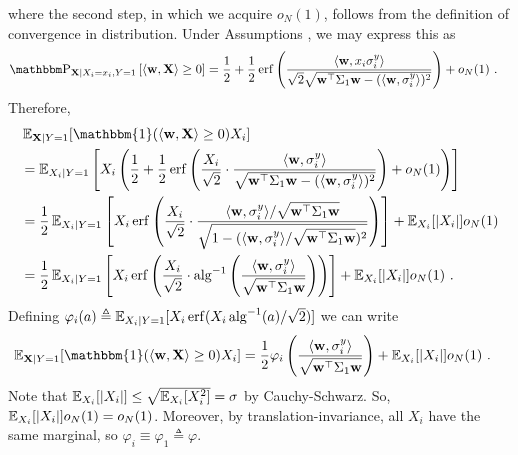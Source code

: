 where the second step, in which we acquire $o_N(1)$, follows from the definition of convergence in distribution.
Under Assumptions , we may express this as
\begin{align*}
    \PR_{\mathbf{X} \mid X_i = x_i, Y = 1} \left[  \langle \mathbf{w}, \mathbf{X} \rangle \geq 0 \right]
    &= \frac{1}{2} + \frac{1}{2} \operatorname{erf}\left( \frac{\langle \mathbf{w}, x_i \sigma_i^y \rangle }{ \sqrt{2} \sqrt{ \mathbf{w}^\top \Sigma_1 \mathbf{w} - (\langle \mathbf{w}, \sigma_i^y \rangle)^2 } } \right) + o_N(1)~.
\end{align*}
Therefore,
\begin{align*}
    &\E_{\mathbf{X} \mid Y=1}[ \mathbbm{1}( \langle \mathbf{w}, \mathbf{X} \rangle \geq 0 ) X_i ] \\
    &= \E_{ X_i \mid Y=1 } \left[ X_i \left( \frac{1}{2} + \frac{1}{2} \operatorname{erf}\left( \frac{X_i}{\sqrt{2}} \cdot \frac{\langle \mathbf{w}, \sigma_i^y \rangle }{ \sqrt{ \mathbf{w}^\top \Sigma_1 \mathbf{w} - (\langle \mathbf{w}, \sigma_i^y \rangle)^2 } } \right) + o_N(1) \right) \right] \\
    &= \frac{1}{2} \E_{ X_i \mid Y=1 } \left[ X_i \operatorname{erf}\left( \frac{X_i}{\sqrt{2}} \cdot \frac{\langle \mathbf{w}, \sigma_i^y \rangle / \sqrt{\mathbf{w}^\top \Sigma_1 \mathbf{w}} }{ \sqrt{ 1 - (\langle \mathbf{w}, \sigma_i^y \rangle / \sqrt{\mathbf{w}^\top \Sigma_1 \mathbf{w}})^2 } } \right) \right] + \E_{X_i}[|X_i|] o_N(1) \\
    &= \frac{1}{2} \E_{ X_i \mid Y=1 } \left[ X_i \operatorname{erf}\left( \frac{X_i}{\sqrt{2}} \cdot \operatorname{alg}^{-1} \left( \frac{ \langle \mathbf{w}, \sigma_i^y \rangle }{ \sqrt{\mathbf{w}^\top \Sigma_1 \mathbf{w}} } \right) \right) \right] + \E_{X_i}[|X_i|] o_N(1)~.
\end{align*}
Defining $\varphi_i(a) \triangleq \operatorname{\mathbb{E}}_{X_i \mid Y=1}[ X_i \operatorname{erf}(X_i \operatorname{alg}^{-1}(a) / \sqrt{2}) ]$ we can write
\begin{align*}
    \E_{\mathbf{X} \mid Y=1}[ \mathbbm{1}( \langle \mathbf{w}, \mathbf{X} \rangle \geq 0 ) X_i ]
    &= \frac{1}{2} \varphi_i \left( \frac{ \langle \mathbf{w}, \sigma_i^y \rangle }{ \sqrt{\mathbf{w}^\top \Sigma_1 \mathbf{w}} } \right) + \E_{X_i}[|X_i|] o_N(1)~.
\end{align*}
Note that $\operatorname{\mathbb{E}}_{X_i}[|X_i|] \leq \sqrt{ \operatorname{\mathbb{E}}_{X_i}[X_i^2] } = \sigma$ by Cauchy-Schwarz.
So, $\operatorname{\mathbb{E}}_{X_i}[|X_i|] o_N(1) = o_N(1)$.
Moreover, by translation-invariance, all $X_i$ have the same marginal, so $\varphi_i \equiv \varphi_1 \triangleq \varphi$.
